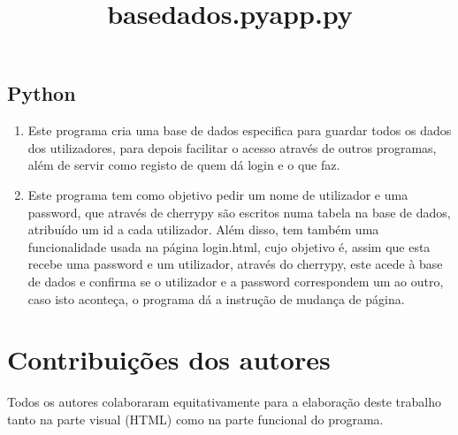 \documentclass{report}
\begin{document}
\section{Python}
\renewcommand{\theenumi}{\arabic{enumi}} 
\begin{enumerate} 

\item\title{\textbf{basedados.py}} 

Este programa cria uma base de dados especifica para guardar todos os dados dos utilizadores, para depois facilitar o acesso através de outros programas, além de servir como registo de quem dá login e o que faz.

\item\title{\textbf{app.py}} 

Este programa tem como objetivo pedir um nome de utilizador e uma password, que através de cherrypy são escritos numa tabela na base de dados, atribuído um id a cada utilizador. Além disso, tem também uma funcionalidade usada na página login.html, cujo objetivo é, assim que esta recebe uma password e um utilizador, através do cherrypy, este acede à base de dados e confirma se o utilizador e a password correspondem um ao outro, caso isto aconteça, o programa dá a instrução de mudança de página.

\end{enumerate}


\chapter*{Contribuições dos autores}
Todos os autores colaboraram equitativamente para a elaboração deste trabalho tanto na parte visual (HTML) como na parte funcional do programa.
\end{document}
